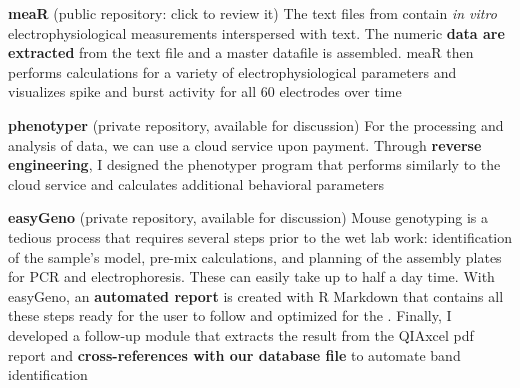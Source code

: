 \documentclass[
  a4paper, 
   maincolor=cvblue,
   sectioncolor=cvblue,
]{fortysecondscv}
\begin{document}

\textbf{meaR} (public repository: click  \href{https://github.com/adrianclo/meaR}{\color{blue}{here}} to review it) \newline
The text files from \href{https://www.multichannelsystems.com/products/vitro-mea-systems}{\color{blue}{Micro-Electrode Arrays}} contain \emph{in vitro} electrophysiological measurements interspersed with text.  The numeric \textbf{data are extracted} from the text file and a master datafile is assembled. meaR then performs calculations for a variety of electrophysiological parameters and visualizes spike and burst activity for all 60 electrodes over time \newline

\textbf{phenotyper} (private repository, available for discussion) \newline
For the processing and analysis of \href{https://www.sylics.com/bioinformatics/cognitionwall/}{\color{blue}{Phenotyper}} data, we can use a cloud service upon payment. Through \textbf{reverse engineering}, I designed the phenotyper program that performs similarly to the cloud service and calculates additional behavioral parameters \newline

\textbf{easyGeno} (private repository, available for discussion) \newline
Mouse genotyping is a tedious process that requires several steps prior to the wet lab work:  identification of the sample's model, pre-mix calculations, and planning of the assembly plates for PCR and electrophoresis. These can easily take up to half a day time. With easyGeno, an \textbf{automated report} is created with R Markdown that contains all these steps ready for the user to follow and optimized for the \href{https://www.qiagen.com/us/service-and-support/learning-hub/technologies-and-research-topics/sample-quality-control/instruments/qiaxcel-advanced/}{\color{blue}{QIAxcel apparatus}}. Finally, I developed a follow-up module that extracts the result from the QIAxcel pdf report and \textbf{cross-references with our database file} to automate band identification \newline
\end{document}
